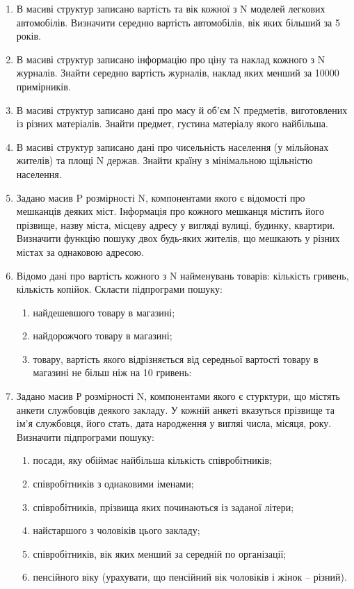 \documentclass[a5paper,titlepage,openany,twoside,draft]{book_unv}%
\makeatletter
\newcommand{\xslalph}[1]{\expandafter\@xslalph\csname c@#1\endcsname}
\newcommand{\@xslalph}[1]{%
    \ifcase#1\or а\or б\or в\or г\or д\or e\or є\or ж\or з\or i%
    \or й\or к\or л\or м\or н\or о\or п\or р\or с\or т%
    \or у\or ф\or х\or ц\or ч\or ш\or ю\or я\or аа\or бб\or вв%
    \else\@ctrerr\fi%
}
\makeatother
\begin{document}
\begin{enumerate}
\item
  В масиві структур записано вартість та вік кожної з N моделей легкових
  автомобілів. Визначити середню вартість автомобілів, вік яких більший
  за 5 років.
\item
  В масиві структур записано інформацію про ціну та наклад кожного з N
  журналів. Знайти середню вартість журналів, наклад яких менший за
  10000 примірників.
\item
  В масиві структур записано дані про масу й об'єм N предметів,
  виготовлених із різних матеріалів. Знайти предмет, густина матеріалу
  якого найбільша.
\item
  В масиві структур записано дані про чисельність населення (у мільйонах
  жителів) та площі N держав. Знайти країну з мінімальною щільністю
  населення.
\item
  Задано масив P розмірності N, компонентами якого є відомості про
  мешканців деяких міст. Інформація про кожного мешканця містить його
  прізвище, назву міста, місцеву адресу у вигляді вулиці, будинку,
  квартири. Визначити функцію пошуку двох будь-яких жителів, що мешкають
  у різних містах за однаковою адресою.
\item
  Відомо дані про вартість кожного з N найменувань товарів: кількість
  гривень, кількість копійок. Скласти підпрограми пошуку:
\begin{enumerate}[label=\xslalph*)]
\item найдешевшого товару в магазині;
\item найдорожчого товару в магазині;
\item товару, вартість якого відрізняється від середньої вартості 
товару в магазині не більш ніж на 10 гривень:

\end{enumerate}

\item
  Задано масив Р розмірності N, компонентами якого є стурктури, що
  містять анкети службовців деякого закладу. У кожній анкеті вказуться
  прізвище та ім'я службовця, його стать, дата народження у вигляі
  числа, місяця, року. Визначити підпрограми пошуку:
\begin{enumerate}[label=\xslalph*)]
\item посади, яку обіймає найбільша кількість співробітників;
\item співробітників з однаковими іменами;
\item співробітників, прізвища яких починаються із заданої літери;
\item найстаршого з чоловіків цього закладу;
\item співробітників, вік яких менший за середній по організації;
\item пенсійного віку (урахувати, що пенсійний вік чоловіків і жінок --
різний).
\end{enumerate}


\end{enumerate}
\end{document}
